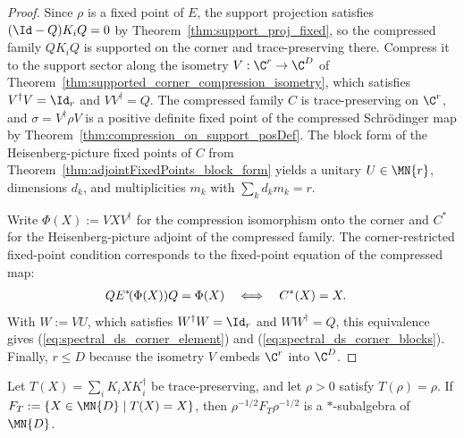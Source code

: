 \begin{proof}
    \leanok
    Since $\rho$ is a fixed point of $E$, the support projection satisfies
    $(\Id-Q)K_iQ=0$ by Theorem~\ref{thm:support_proj_fixed}, so the
    compressed family $QK_iQ$ is supported on the corner and
    trace-preserving there. Compress it to the support sector along the
    isometry $V:\C^r\to\C^D$ of
    Theorem~\ref{thm:supported_corner_compression_isometry}, which satisfies
    $V^\dagger V=\Id_r$ and $VV^\dagger=Q$. The compressed family $C$ is
    trace-preserving on $\C^r$, and
    $\sigma=V^\dagger\rho V$ is a positive definite fixed point of the
    compressed Schr\"odinger map by
    Theorem~\ref{thm:compression_on_support_posDef}. The block form of the
    Heisenberg-picture fixed points of $C$ from
    Theorem~\ref{thm:adjointFixedPoints_block_form} yields a unitary
    $U\in\MN{r}$, dimensions $d_k$, and multiplicities $m_k$ with
    $\sum_kd_km_k=r$.

    Write $\Phi(X):=VXV^\dagger$ for the compression isomorphism onto the
    corner and $C^*$ for the Heisenberg-picture adjoint of the compressed
    family. The corner-restricted fixed-point condition corresponds to the
    fixed-point equation of the compressed map:
    \begin{align}
        QE^*\!(\Phi(X))Q=\Phi(X)
         & \quad\Longleftrightarrow\quad C^*(X)=X.
        \notag
    \end{align}
    With $W:=VU$, which satisfies $W^\dagger W=\Id_r$ and
    $WW^\dagger=Q$, this equivalence gives
    (\ref{eq:spectral_ds_corner_element}) and
    (\ref{eq:spectral_ds_corner_blocks}). Finally, $r\leq D$ because the
    isometry $V$ embeds $\C^r$ into $\C^D$.
\end{proof}

\begin{theorem}%
    \label{thm:weightedFixedPointsStarSubalgebra}
    \leanok
    Let $T(X)=\sum_iK_iXK_i^\dagger$ be trace-preserving, and let
    $\rho>0$ satisfy $T(\rho)=\rho$. If
    $F_T:=\{X\in\MN{D}\mid T(X)=X\}$, then
    $\rho^{-1/2}F_T\rho^{-1/2}$ is a $*$-subalgebra of $\MN{D}$.
\end{theorem}


